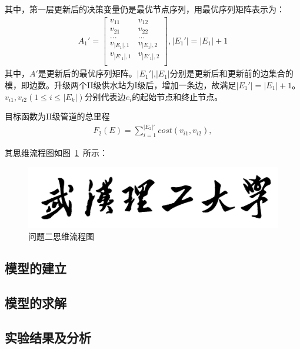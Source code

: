 \documentclass{whutmod}
\begin{document}
			其中，第一层更新后的决策变量仍是最优节点序列，用最优序列矩阵表示为：
			\begin{gather}
			A_1'=
			\begin{bmatrix}
				v_{11} &v_{12} \\ 
				v_{21} &v_{22} \\ 
				...&...\\
				v_{\left | E _{1}\right |,1}&v_{\left | E _{1}\right |,2}\\
				v_{\left | E' _{1}\right |,1}&v_{\left | E'_{1}\right |,2}\\
			\end{bmatrix} ,|E_1'|=|E_1|+1
			\end{gather}
			其中，$A'$是更新后的最优序列矩阵。$|E_1'|$,$|E_1|$分别是更新后和更新前的边集合的模，即边数。升级两个II级供水站为I级后，增加一条边，故满足$|E_1'|=|E_1|+1$。$v_{i1}, v_{i2}(1\leq i \leq|E_{k}|)$分别代表边$e_i$的起始节点和终止节点。
			
			目标函数为II级管道的总里程
			\begin{gather}
			F_{2}(E)=\sum_{i=1}^{|E_{2}|'}cost(v_{i1},v_{i2}),
			\end{gather}

			
    		其思维流程图如图~\ref{lssssct}~所示：

			\begin{figure}[H]
				\centering
				\includegraphics[width=\textwidth]{figures/whut.jpg}
				\caption{问题二思维流程图}\label{lssssct}
			\end{figure}

		\subsection{模型的建立}
		
		\subsection{模型的求解}

        \subsection{实验结果及分析}
        
\end{document}
